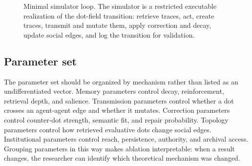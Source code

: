 \documentclass[11pt]{article}
\theoremstyle{remark}
\begin{document}
\begin{figure}[htbp]
\centering
{}
\caption{Minimal simulator loop. The simulator is a restricted executable realization of the dot-field transition: retrieve traces, act, create traces, transmit and mutate them, apply correction and decay, update social edges, and log the transition for validation.}
\label{fig:minimal-simulator-loop}
\end{figure}


\subsection{Parameter set}\label{minimal-parameter-set}

The parameter set should be organized by mechanism rather than listed as an undifferentiated vector. Memory parameters control decay, reinforcement, retrieval depth, and salience. Transmission parameters control whether a dot crosses an agent-agent edge and whether it mutates. Correction parameters control counter-dot strength, semantic fit, and repair probability. Topology parameters control how retrieved evaluative dots change social edges. Institutional parameters control reach, persistence, authority, and archival access. Grouping parameters in this way makes ablation interpretable: when a result changes, the researcher can identify which theoretical mechanism was changed.
\end{document}
